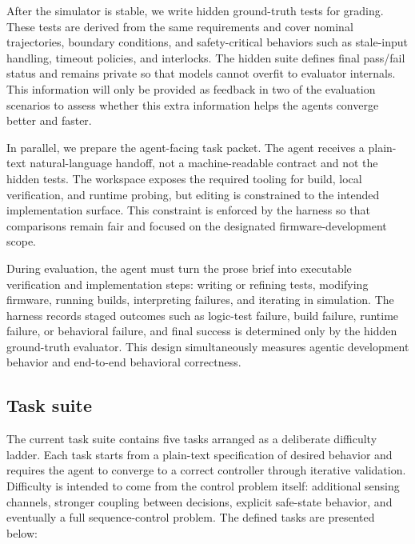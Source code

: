 \documentclass[a4paper,fleqn]{cas-dc}
\begin{document}
After the simulator is stable, we write hidden ground-truth tests for grading. These tests are derived from the same requirements and cover nominal trajectories, boundary conditions, and safety-critical behaviors such as stale-input handling, timeout policies, and interlocks. The hidden suite defines final pass/fail status and remains private so that models cannot overfit to evaluator internals. This information will only be provided as feedback in two of the evaluation scenarios to assess whether this extra information helps the agents converge better and faster.

In parallel, we prepare the agent-facing task packet. The agent receives a plain-text natural-language handoff, not a machine-readable contract and not the hidden tests. The workspace exposes the required tooling for build, local verification, and runtime probing, but editing is constrained to the intended implementation surface. This constraint is enforced by the harness so that comparisons remain fair and focused on the designated firmware-development scope.

During evaluation, the agent must turn the prose brief into executable verification and implementation steps: writing or refining tests, modifying firmware, running builds, interpreting failures, and iterating in simulation. The harness records staged outcomes such as logic-test failure, build failure, runtime failure, or behavioral failure, and final success is determined only by the hidden ground-truth evaluator. This design simultaneously measures agentic development behavior and end-to-end behavioral correctness.

\subsection{Task suite}
\label{sec:tasks}

The current task suite contains five tasks arranged as a deliberate difficulty ladder. Each task starts from a plain-text specification of desired behavior and requires the agent to converge to a correct controller through iterative validation. Difficulty is intended to come from the control problem itself: additional sensing channels, stronger coupling between decisions, explicit safe-state behavior, and eventually a full sequence-control problem. The defined tasks are presented below:
\end{document}
